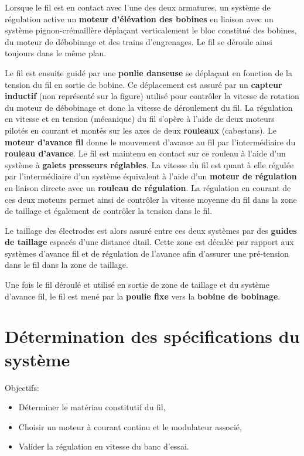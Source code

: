 Lorsque le fil est en contact avec l'une des deux armatures, un système de régulation active un \textbf{moteur d'élévation des bobines} en liaison avec un système pignon-crémaillère déplaçant verticalement le bloc constitué des bobines, du moteur de débobinage et des trains d'engrenages. Le fil se déroule ainsi toujours dans le même plan.

Le fil est ensuite guidé par une \textbf{poulie danseuse} se déplaçant en fonction de la tension du fil en sortie de bobine. Ce déplacement est assuré par un \textbf{capteur inductif} (non représenté sur la figure) utilisé pour contrôler la vitesse de rotation du moteur de débobinage et donc la vitesse de déroulement du fil. La régulation en vitesse et en tension (mécanique) du fil s'opère à l'aide de deux moteurs pilotés en courant et montés sur les axes de deux \textbf{rouleaux} (cabestans). Le \textbf{moteur d'avance fil} donne le mouvement d'avance au fil par l'intermédiaire du \textbf{rouleau d'avance}. Le fil est maintenu en contact sur ce rouleau à l'aide d'un système à \textbf{galets presseurs réglables}. La vitesse du fil est quant à elle régulée par l'intermédiaire d'un système équivalent à l'aide d'un \textbf{moteur de régulation} en liaison directe avec un \textbf{rouleau de régulation}. La régulation en courant de ces deux moteurs permet ainsi de contrôler la vitesse moyenne du fil dans la zone de taillage et également de contrôler la tension dans
le fil.

Le taillage des électrodes est alors assuré entre ces deux systèmes par des \textbf{guides de taillage} espacés d'une distance dtail. Cette zone est décalée par rapport aux systèmes d'avance fil et de régulation de l'avance afin d'assurer une pré-tension dans le fil dans la zone de taillage.

Une fois le fil déroulé et utilisé en sortie de zone de taillage et du système d'avance fil, le fil est mené par la \textbf{poulie fixe} vers la \textbf{bobine de bobinage}.

\section{Détermination des spécifications du système}

Objectifs:
\begin{itemize}
 \item Déterminer le matériau constitutif du fil,
 \item Choisir un moteur à courant continu et le modulateur associé,
 \item Valider la régulation en vitesse du banc d'essai.
\end{itemize}

